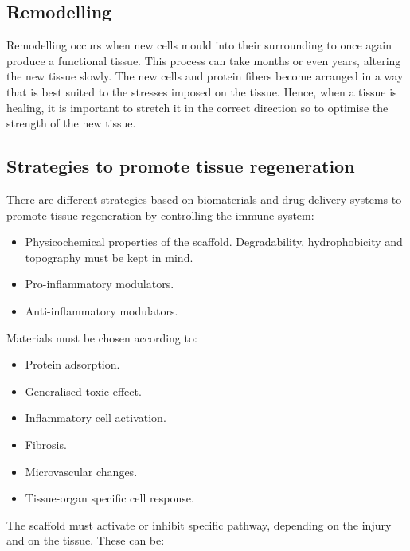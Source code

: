 	\subsection{Remodelling}
	Remodelling occurs when new cells mould into their surrounding to once again produce a functional tissue.
	This process can take months or even years, altering the new tissue slowly.
	The new cells and protein fibers become arranged in a way that is best suited to the stresses imposed on the tissue.
	Hence, when a tissue is healing, it is important to stretch it in the correct direction so to optimise the strength of the new tissue.

	\subsection{Strategies to promote tissue regeneration}
	There are different strategies based on biomaterials and drug delivery systems to promote tissue regeneration by controlling the immune system:

	\begin{multicols}{2}
		\begin{itemize}
			\item Physicochemical properties of the scaffold.
				Degradability, hydrophobicity and topography must be kept in mind.
			\item Pro-inflammatory modulators.
			\item Anti-inflammatory modulators.
		\end{itemize}
	\end{multicols}

	Materials must be chosen according to:

	\begin{multicols}{2}
		\begin{itemize}
			\item Protein adsorption.
			\item Generalised toxic effect.
			\item Inflammatory cell activation.
			\item Fibrosis.
			\item Microvascular changes.
			\item Tissue-organ specific cell response.
		\end{itemize}
	\end{multicols}

	The scaffold must activate or inhibit specific pathway, depending on the injury and on the tissue.
	These can be:

